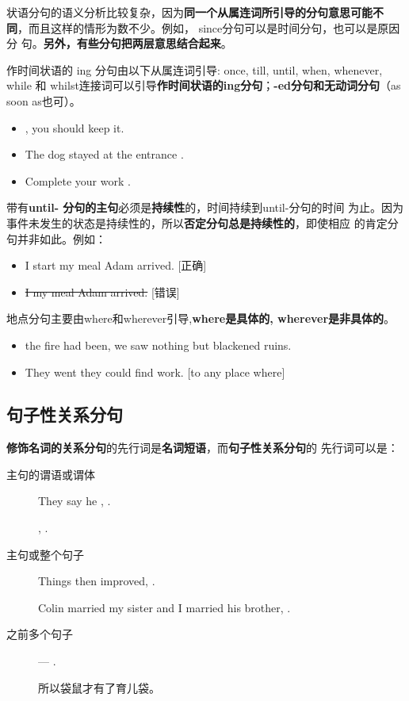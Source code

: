 状语分句的语义分析比较复杂，因为\textbf{同一个从属连词所引导的分句意思可能不
  同}，而且这样的情形为数不少。例如， since分句可以是时间分句，也可以是原因分
句。\textbf{另外，有些分句把两层意思结合起来}。

作时间状语的 ing 分句由以下从属连词引导: once, till, until, when, whenever,
while 和 whilst连接词可以引导\textbf{作时间状语的ing分句}；\textbf{-ed分句和无动词分句}（as soon
as也可）。
\begin{itemize}
\item {}, you should keep it.
\item The dog stayed at the entrance .
\item Complete your work .
\end{itemize}

带有\textbf{until- 分句的主句}必须是\textbf{持续性}的，时间持续到until-分句的时间
为止。因为事件未发生的状态是持续性的，所以\textbf{否定分句总是持续性的}，即使相应
的肯定分句并非如此。例如：
\begin{itemize}
\item I  start my meal  Adam arrived. [正确]
\item \sout{I  my meal  Adam arrived.} [错误]
\end{itemize}


地点分句主要由where和wherever引导,\textbf{where是具体的, wherever是非具体的}。
\begin{itemize}
\item {} the fire had been, we saw nothing but blackened ruins.

\item They went  they could find work. [to any place where]
\end{itemize}

\subsection{句子性关系分句}

\textbf{修饰名词的关系分句}的先行词是\textbf{名词短语}，而\textbf{句子性关系分句}的
先行词可以是：
\begin{description}
\item[主句的谓语或谓体] They say he , .

  , .

\item[主句或整个句子] Things then improved, .

  Colin married my sister and I married his brother, .

\item[之前多个句子] --- .

  所以袋鼠才有了育儿袋。

\end{description}

